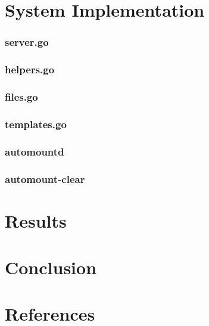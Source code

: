 \documentclass[12pt]{article}
\begin{document}
\fi  %


\iftrue  %


\section{System Implementation}

\lstset{language=Go}
\lstset{basicstyle=\ttffamily}

\subsubsection{server.go}
%

\subsubsection{helpers.go}


\subsubsection{files.go}


\subsubsection{templates.go}


\lstset{language=Bash}

\subsubsection{automountd}


\subsubsection{automount-clear}



\fi  %


\section{Results}


\section{Conclusion}


\section{References}
\end{document}
